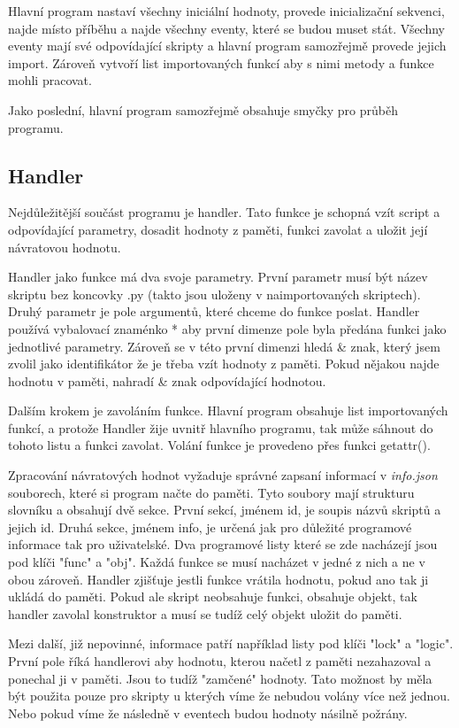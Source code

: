 \documentclass[12pt,a4paper]{article}
\begin{document}
Hlavní program nastaví všechny iniciální hodnoty, provede inicializační sekvenci, najde místo příběhu a najde všechny eventy, které se budou muset stát. Všechny eventy mají své odpovídající skripty a hlavní program samozřejmě provede jejich import. Zároveň vytvoří list importovaných funkcí aby s nimi metody a funkce mohli pracovat.

Jako poslední, hlavní program samozřejmě obsahuje smyčky pro průběh programu.

\subsection{Handler}
Nejdůležitější součást programu je handler. Tato funkce je schopná vzít script a odpovídající parametry, dosadit hodnoty z paměti, funkci zavolat a uložit její návratovou hodnotu. 

Handler jako funkce má dva svoje parametry. První parametr musí být název skriptu bez koncovky .py (takto jsou uloženy v naimportovaných skriptech). Druhý parametr je pole argumentů, které chceme do funkce poslat. Handler používá vybalovací znaménko * aby první dimenze pole byla předána funkci jako jednotlivé parametry. Zároveň se v této první dimenzi hledá \& znak, který jsem zvolil jako identifikátor že je třeba vzít hodnoty z paměti. Pokud nějakou najde hodnotu v paměti, nahradí \& znak odpovídající hodnotou.

Dalším krokem je zavoláním funkce. Hlavní program obsahuje list importovaných funkcí, a protože Handler žije uvnitř hlavního programu, tak může sáhnout do tohoto listu a funkci zavolat. Volání funkce je provedeno přes funkci getattr().

Zpracování návratových hodnot vyžaduje správné zapsaní informací v \textit{info.json} souborech, které si program načte do paměti. Tyto soubory mají strukturu slovníku a obsahují dvě sekce. První sekcí, jménem id, je soupis názvů skriptů a jejich id. Druhá sekce, jménem info, je určená jak pro důležité programové informace tak pro uživatelské. Dva programové listy které se zde nacházejí jsou pod klíči "func" a "obj". Každá funkce se musí nacházet v jedné z nich a ne v obou zároveň. Handler zjišťuje jestli funkce vrátila hodnotu, pokud ano tak ji ukládá do paměti. Pokud ale skript neobsahuje funkci, obsahuje objekt, tak handler zavolal konstruktor a musí se tudíž celý objekt uložit do paměti.

Mezi další, již nepovinné, informace patří například listy pod klíči "lock" a "logic". První pole říká handlerovi aby hodnotu, kterou načetl z paměti nezahazoval a ponechal ji v paměti. Jsou to tudíž "zamčené" hodnoty. Tato možnost by měla být použita pouze pro skripty u kterých víme že nebudou volány více než jednou. Nebo pokud víme že následně v eventech budou hodnoty násilně požrány. 
\end{document}
